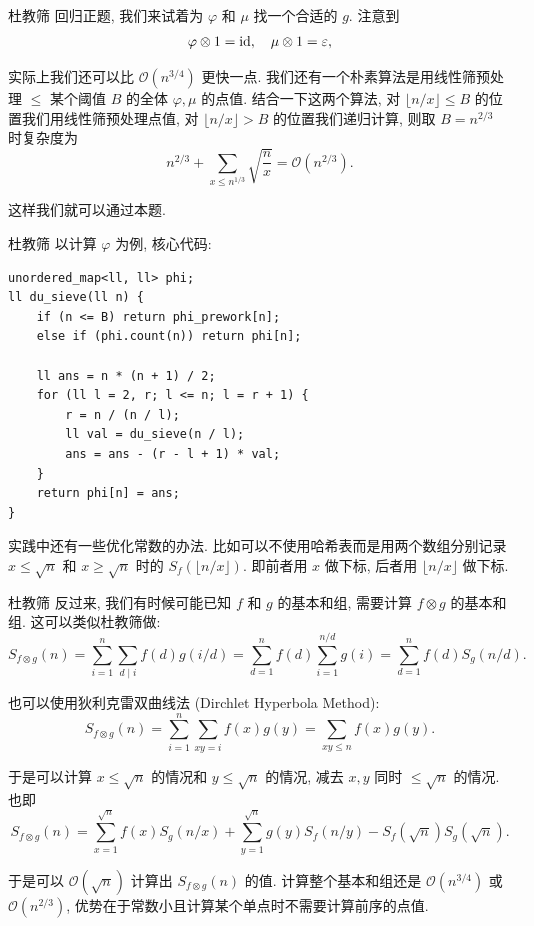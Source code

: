 \documentclass{beamer}
\begin{document}
    \begin{frame}{杜教筛}
        回归正题, 我们来试着为 $\varphi$ 和 $\mu$ 找一个合适的 $g$. 注意到
        $$
        \varphi\otimes 1={\rm id},\quad\mu\otimes 1=\varepsilon,
        $$

        实际上我们还可以比 $\mathcal O(n^{3/4})$ 更快一点. 我们还有一个朴素算法是用线性筛预处理 $\leq$ 某个阈值 $B$ 的全体 $\varphi,\mu$ 的点值. 结合一下这两个算法, 对 $\lfloor n/x\rfloor\leq B$ 的位置我们用线性筛预处理点值, 对 $\lfloor n/x\rfloor>B$ 的位置我们递归计算, 则取 $B=n^{2/3}$ 时复杂度为
        $$
        n^{2/3}+\sum_{x\leq n^{1/3}}\sqrt{\frac nx}=\mathcal O(n^{2/3}).
        $$

        这样我们就可以通过本题.
    \end{frame}

    \begin{frame}[fragile]{杜教筛}
        以计算 $\varphi$ 为例, 核心代码:
        \begin{lstlisting}
unordered_map<ll, ll> phi;
ll du_sieve(ll n) {
    if (n <= B) return phi_prework[n];
    else if (phi.count(n)) return phi[n];

    ll ans = n * (n + 1) / 2;
    for (ll l = 2, r; l <= n; l = r + 1) {
        r = n / (n / l);
        ll val = du_sieve(n / l);
        ans = ans - (r - l + 1) * val;
    }
    return phi[n] = ans;
}\end{lstlisting}
    实践中还有一些优化常数的办法. 比如可以不使用哈希表而是用两个数组分别记录 $x\leq\sqrt n$ 和 $x\geq\sqrt n$ 时的 $S_f(\lfloor n/x\rfloor)$. 即前者用 $x$ 做下标, 后者用 $\lfloor n/x\rfloor$ 做下标.
    \end{frame}

    \begin{frame}{杜教筛}
        反过来, 我们有时候可能已知 $f$ 和 $g$ 的基本和组, 需要计算 $f\otimes g$ 的基本和组. 这可以类似杜教筛做:
        $$
        S_{f\otimes g}(n)=\sum_{i=1}^n\sum_{d\mid i}f(d)g(i/d)=\sum_{d=1}^nf(d)\sum_{i=1}^{n/d}g(i)=\sum_{d=1}^nf(d)S_g(n/d).
        $$

        也可以使用狄利克雷双曲线法 (Dirchlet Hyperbola Method):
        $$
        S_{f\otimes g}(n)=\sum_{i=1}^n\sum_{xy=i}f(x)g(y)=\sum_{xy\leq n}f(x)g(y).
        $$

        于是可以计算 $x\leq\sqrt n$ 的情况和 $y\leq\sqrt n$ 的情况, 减去 $x,y$ 同时 $\leq\sqrt n$ 的情况. 也即
        $$
        S_{f\otimes g}(n)=\sum_{x=1}^{\sqrt n}f(x)S_g(n/x)+\sum_{y=1}^{\sqrt n}g(y)S_f(n/y)-S_f(\sqrt n)S_g(\sqrt n).
        $$

        于是可以 $\mathcal O(\sqrt n)$ 计算出 $S_{f\otimes g}(n)$ 的值. 计算整个基本和组还是 $\mathcal O(n^{3/4})$ 或 $\mathcal O(n^{2/3})$, 优势在于常数小且计算某个单点时不需要计算前序的点值.
    \end{frame}
\end{document}
